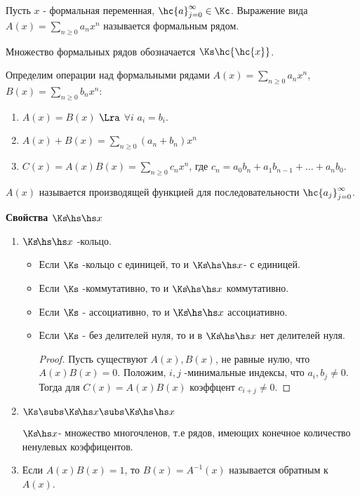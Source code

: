 \documentclass[unicode, 10pt, a4paper, oneside, fleqn]{article}
\begin{document}
\begin{df}
  Пусть $x$ - формальная переменная, $\hc{a}_{j=0}^\infty\in\Kc$.
  Выражение вида $\displaystyle A(x)=\sum_{n\ge 0}a_nx^n$ называется формальным рядом.
\end{df}
\begin{denote}
  Множество формальных рядов обозначается $\Ks\hc{\hc{x}}$.
\end{denote}
Определим операции над формальными рядами $\displaystyle A(x)=\sum_{n\ge 0}a_nx^n$,
$\displaystyle B(x)=\sum_{n\ge 0}b_nx^n$:
\begin{enumerate}
  \item $A(x)=B(x)$ $\Lra$ $\forall i$ $a_i=b_i$.
  \item $\displaystyle A(x)+B(x) = \sum_{n\ge 0}(a_n+b_n)x^n$
  \item $C(x)=A(x)B(x)=\sum_{n\ge 0}c_nx^n$, где $c_n=a_0b_n+a_1b_{n-1}+\dots+a_nb_0$.
\end{enumerate}
\begin{denote}
  $A(x)$ называется производящей функцией для  последовательности  $\hc{a_j}_{j=0}^\infty$.
\end{denote}
{\bf Свойства $\Ksr$\par}
\begin{enumerate}
  \item $\Ksr$ -кольцо.
    \begin{itemize}
      \item Если $\Ks$ -кольцо с единицей, то и $\Ksr$- с единицей.
      \item Если $\Ks$ -коммутативно, то и $\Ksr$ коммутативно.
      \item Если $\Ks$ - ассоциативно, то и $\Ksr$ ассоциативно.
      \item Если $\Ks$ - без делителей нуля, то и в $\Ksr$ нет делителей нуля.
        \begin{proof}
          Пусть существуют $A(x),B(x)$, не равные нулю, что $A(x)B(x)=0$. Положим,
          $i,j$ -минимальные индексы, что $a_i,b_j\neq 0$. Тогда для $C(x)=A(x)B(x)$ коэффцент
          $c_{i+j}\neq 0$.
        \end{proof}
    \end{itemize}
    \item      $\displaystyle \Ks\subs\Ksm\subs\Ksr$
      \begin{df}
        $\Ksm$- множество многочленов, т.е рядов, имеющих конечное количество ненулевых 
        коэффицентов.
      \end{df}
      \item Если $A(x)B(x)=1$, то $B(x)=A^{-1}(x)$ называется обратным к $A(x)$.
\end{enumerate}
\end{document}

